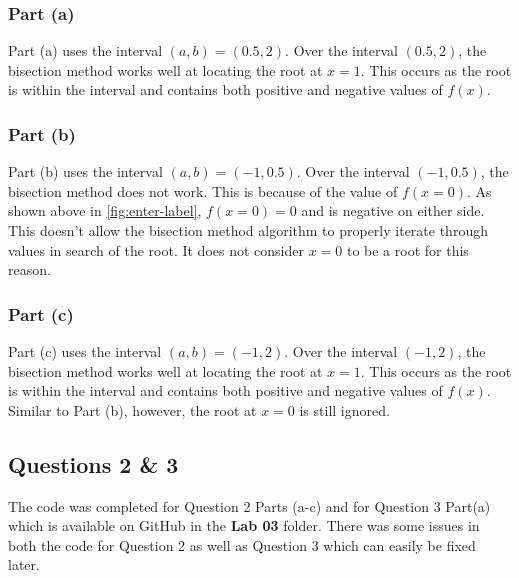 \documentclass{article}
\begin{document}
\subsubsection{Part (a)}
Part (a) uses the interval \((a,b) = (0.5,2)\).
Over the interval \((0.5,2)\), the bisection method works well at locating the root at \(x=1\). This occurs as the root is within the interval and contains both positive and negative values of \(f(x)\).

\subsubsection{Part (b)}
Part (b) uses the interval \((a,b) = (-1,0.5)\).
Over the interval \((-1,0.5)\), the bisection method does not work. This is because of the value of \(f(x=0)\). As shown above in \ref{fig:enter-label}, \(f(x=0)=0\) and is negative on either side. This doesn't allow the bisection method algorithm to properly iterate through values in search of the root. It does not consider \(x=0\) to be a root for this reason.

\subsubsection{Part (c)}
Part (c) uses the interval \((a,b) = (-1,2)\).
Over the interval \((-1,2)\), the bisection method works well at locating the root at \(x=1\). This occurs as the root is within the interval and contains both positive and negative values of \(f(x)\). Similar to Part (b), however, the root at \(x=0\) is still ignored.

\subsection{Questions 2 \& 3}
The code was completed for Question 2 Parts (a-c) and for Question 3 Part(a) which is available on GitHub in the \textbf{Lab 03} folder. There was some issues in both the code for Question 2 as well as Question 3 which can easily be fixed later.
\end{document}
